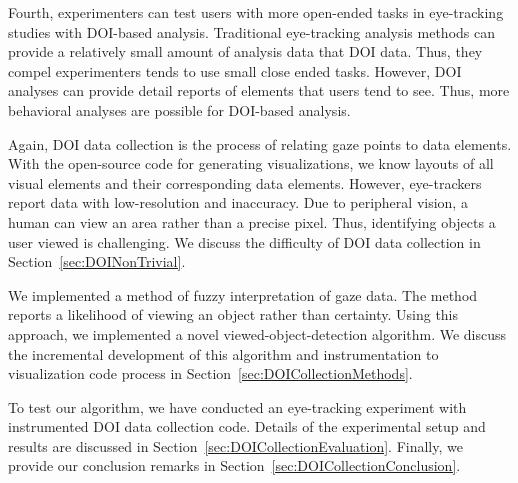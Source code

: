 Fourth, experimenters can test users with more open-ended tasks in eye-tracking studies with DOI-based analysis. Traditional eye-tracking analysis methods can provide a relatively small amount of analysis data that DOI data. Thus, they compel experimenters tends to use small close ended tasks. However, DOI analyses can provide detail reports of elements that users tend to see. Thus, more behavioral analyses are possible for DOI-based analysis. 

Again, DOI data collection is the process of relating gaze points to data elements. With the open-source code for generating visualizations, we know layouts of all visual elements and their corresponding data elements. However, eye-trackers report data with low-resolution and inaccuracy. Due to peripheral vision, a human can view an area rather than a precise pixel. Thus, identifying objects a user viewed is challenging. We discuss the difficulty of DOI data collection in Section~\ref{sec:DOINonTrivial}. 

We implemented a method of fuzzy interpretation of gaze data. The method reports a likelihood of viewing an object rather than certainty. Using this approach, we implemented a novel viewed-object-detection algorithm. We discuss the incremental development of this algorithm and instrumentation to visualization code process in Section~\ref{sec:DOICollectionMethods}. 

To test our algorithm, we have conducted an eye-tracking experiment with instrumented DOI data collection code. Details of the experimental setup and results are discussed in Section~\ref{sec:DOICollectionEvaluation}. Finally, we provide our conclusion remarks in Section~\ref{sec:DOICollectionConclusion}.